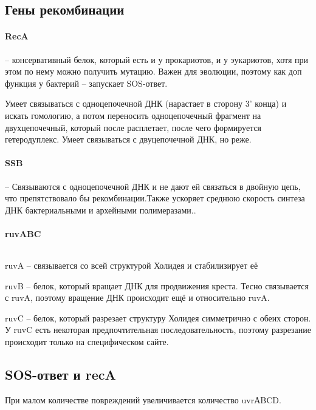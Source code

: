 \subsection{Гены рекомбинации}
\paragraph{RecA}  -- консервативный белок, который есть и у прокариотов, и у эукариотов, хотя при этом по нему можно получить мутацию. Важен для эволюции, поэтому как доп функция у бактерий -- запускает SOS-ответ. 

Умеет связываться с одноцепочечной ДНК (нарастает в сторону 3' конца) и искать гомологию, а потом переносить одноцепочечный фрагмент на двухцепочечный, который после расплетает, после чего формируется гетеродуплекс. Умеет связываться с двуцепочечной ДНК, но реже. 
\paragraph{SSB} -- Связываются с одноцепочечной ДНК и не дают ей связаться в двойную цепь, что препятствовало бы рекомбинации.Также ускоряет среднюю скорость синтеза ДНК бактериальными и архейными полимеразами..
\paragraph{ruvABC} $\ $\newline



 ruvA -- связывается со всей структурой Холидея и стабилизирует её
 
 ruvB -- белок, который вращает ДНК для продвижения креста. Тесно связывается с ruvA, поэтому вращение ДНК происходит ещё и относительно ruvA. 
 
 ruvC -- белок, который разрезает структуру Холидея симметрично с обеих сторон. У ruvC есть некоторая предпочтительная последовательность, поэтому разрезание происходит только на специфическом сайте. 
 	\begin{figure}[H]
 	\centering
 	\qquad
 \end{figure}
 	
\subsection{SOS-ответ и recA}

При малом количестве повреждений увеличивается количество uvrАBCD. 

